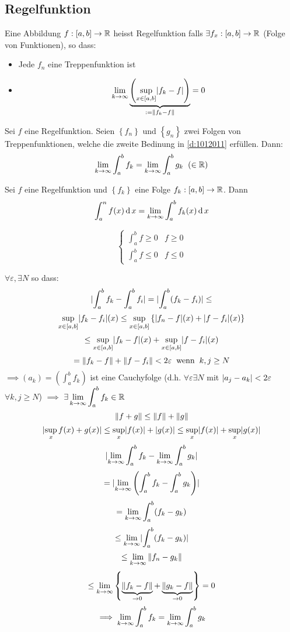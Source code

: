 \subsection{Regelfunktion}
\begin{Def}\label{d:1012011}
  Eine Abbildung $f:[a,b]\to\mathbb{R}$ heisst Regelfunktion falls $\exists f_x:[a,b]\to\mathbb{R}$ (Folge von Funktionen), so dass:
  \begin{itemize}
    \item Jede $f_n$ eine Treppenfunktion ist
    \item
      \[\displaystyle\lim_{k\rightarrow\infty}\underbrace{\left( \sup_{x\in[a,b]}\mathopen| f_k-f \mathclose| \right)}_{:=\left\| f_k-f \right\|}=0\]
  \end{itemize}
\end{Def}
\begin{Sat}
  Sei $f$ eine Regelfunktion. Seien $\left\{ f_n \right\}$ und $\left\{ g_n \right\}$ zwei Folgen von Treppenfunktionen, welche die zweite Bedinung in \ref{d:1012011} erfüllen. Dann:
  \[\displaystyle\lim_{k\rightarrow\infty}\int_a^bf_k=\displaystyle\lim_{k\rightarrow\infty}\int_a^bg_k\hspace{2mm}(\in\mathbb{R})\]
\end{Sat}
\begin{Def}
  Sei $f$ eine Regelfunktion und $\left\{ f_k \right\}$ eine Folge $f_k:[a,b]\to\mathbb{R}$. Dann
  \[\int_a^nf(x)\operatorname{d} x=\displaystyle\lim_{k\rightarrow\infty}\int_a^bf_k(x)\operatorname{d} x\]
\end{Def}
\begin{Bem}
  \[ \begin{cases}
    \int_a^bf\geq 0& f\geq 0\\
    \int_a^bf\leq 0& f\leq 0
  \end{cases}\]
\end{Bem}
\begin{Bew}
  $\forall \varepsilon, \exists N$ so dass:
  \[\mathopen| \int_a^bf_k-\int_a^bf_i \mathclose|=\mathopen| \int_a^b(f_k-f_i) \mathclose|\leq\]
  \[\sup_{x\in[a,b]}\mathopen| f_k-f_i \mathclose|(x)\leq \sup_{x\in[a,b]}\left\{ \mathopen| f_n-f \mathclose|(x)+\mathopen| f-f_i \mathclose|(x) \right\}\]
  \[\leq \sup_{x\in[a,b]}\mathopen| f_k-f \mathclose|(x)+\sup_{x\in[a,b]}\mathopen| f-f_i \mathclose|(x)\]
  \[=\left\| f_k-f \right\|+\left\| f-f_i \right\|<2\varepsilon\hspace{2mm}\text{wenn}\hspace{2mm} k,j\geq N\]
  $\implies (a_k)=\left( \int_a^bf_k \right)$ ist eine Cauchyfolge (d.h. $\forall \varepsilon\exists N$ mit $\mathopen| a_j-a_k \mathclose|<2\varepsilon$ $\forall k,j\geq N$) $\implies$ $\exists \displaystyle\lim_{k\rightarrow\infty}\int_a^bf_k\in\mathbb{R}$
  \[\left\| f+g \right\|\leq \left\| f \right\|+\left\| g \right\|\]
  \[\mathopen| \sup_xf(x)+g(x) \mathclose|\leq \sup_x\mathopen| f(x) \mathclose|+\mathopen| g(x) \mathclose|\leq\sup_x\mathopen| f(x) \mathclose|+\sup_x\mathopen| g(x) \mathclose|\]
  \[\mathopen| \displaystyle\lim_{k\rightarrow\infty}\int_a^bf_k-\displaystyle\lim_{k\rightarrow\infty}\int_a^bg_k \mathclose|\]
  \[=\mathopen| \displaystyle\lim_{k\rightarrow\infty}\left( \int_a^bf_k-\int_a^bg_k \right) \mathclose|\]
  \[=\displaystyle\lim_{k\rightarrow\infty}\int_a^b(f_k-g_k)\]
  \[\leq \displaystyle\lim_{k\rightarrow\infty}\mathopen| \int_a^b(f_k-g_k) \mathclose|\]
  \[\leq\displaystyle\lim_{k\rightarrow\infty}\left\| f_n-g_k \right\|\]
  \[\leq\displaystyle\lim_{k\rightarrow\infty}\left\{ \underbrace{\left\| f_k-f \right\|}_{\to 0}+\underbrace{\left\| g_k-f \right\|}_{\to 0} \right\}=0\]
  \[\implies \displaystyle\lim_{k\rightarrow\infty}\int_a^bf_k=\displaystyle\lim_{k\rightarrow\infty}\int_a^bg_k\]
\end{Bew}
